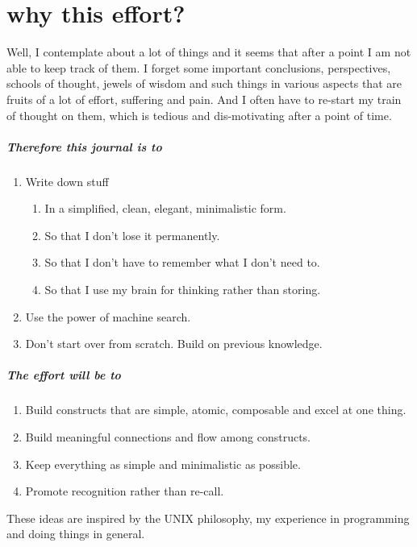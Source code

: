 \documentclass[./main.tex]{subfiles}
\begin{document}
\chapter*{why this effort?}

Well, I contemplate about a lot of things and it seems that after a point I am not able to keep track of them.
I forget some important conclusions, perspectives, schools of thought, jewels of wisdom and such things in various aspects that are fruits of a lot of effort, suffering and pain.
And I often have to re-start my train of thought on them, which is tedious and dis-motivating after a point of time.

\paragraph{Therefore this journal is to}

\begin{enumerate}[noitemsep]
  \item Write down stuff
    \begin{enumerate}[noitemsep]
      \item In a simplified, clean, elegant, minimalistic form.
      \item So that I don't lose it permanently.
      \item So that I don't have to remember what I don't need to.
      \item So that I use my brain for thinking rather than storing.
    \end{enumerate}
  \item Use the power of machine search.
  \item Don't start over from scratch. Build on previous knowledge.
\end{enumerate}

\begin{figure}[h]
  \centering
\end{figure}

\paragraph{The effort will be to}
\begin{enumerate}[noitemsep]
  \item Build constructs that are simple, atomic, composable and excel at one thing.
  \item Build meaningful connections and flow among constructs.
  \item Keep everything as simple and minimalistic as possible.
  \item Promote recognition rather than re-call.
\end{enumerate}
These ideas are inspired by the UNIX philosophy, my experience in programming and doing things in general.
\end{document}
